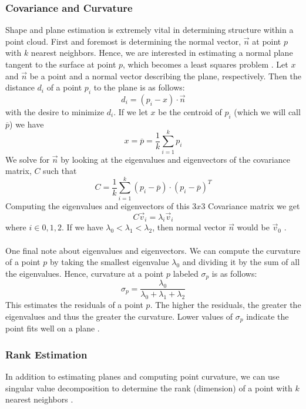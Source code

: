 \documentclass[11pt]{article}
\theoremstyle{definition}
\begin{document}
\subsubsection{Covariance and Curvature}\label{subsub:cov}
Shape and plane estimation is extremely vital in determining structure within a point cloud.   First and foremost is determining the normal vector, $\vec{n}$ at point $p$ with $k$ nearest neighbors.  Hence, we are interested in estimating a normal plane tangent to the surface at point $p$, which becomes a least squares problem \cite{RusuDoctoralDissertation}.  Let $x$ and $\vec{n}$ be a point and a normal vector describing the plane, respectively.  Then the distance $d_i$ of a point $p_i$ to the plane is as follows:
\begin{equation}\label{eqn:least_square}
d_i = (p_i - x)\cdot{\vec{n}}
\end{equation}
with the desire to minimize $d_i$.   If we let $x$ be the centroid of $p_i$ (which we will call $\overline{p}$) we have
\begin{equation}\label{eqn:centroid}
x = \overline{p} = \frac{1}{k}\sum_{i=1}^{k}p_i
\end{equation}
We solve for $\vec{n}$ by looking at the eigenvalues and eigenvectors of the covariance matrix, $C$ such that
\begin{equation}\label{eqn:cov}
C = \frac{1}{k}\sum_{i=1}^{k}(p_i - \overline{p})\cdot(p_i - \overline{p})^T
\end{equation}
Computing the eigenvalues and eigenvectors of this $3x3$ Covariance matrix we get 
\begin{equation}\label{eqn:eigen}
C\vec{v}_i = \lambda_i\vec{v}_i 
\end{equation}
where $i \in {0,1,2}$.  If we have $\lambda_0 < \lambda_1 < \lambda_2$, then normal vector $\vec{n}$ would be $\vec{v}_0$ \cite{RusuDoctoralDissertation}.  
\\\\
One final note about eigenvalues and eigenvectors.  We can compute the curvature of a point $p$ by taking the smallest eigenvalue $\lambda_0$ and dividing it by the sum of all the eigenvalues.  Hence, curvature at a point $p$ labeled $\sigma_p$ is as follows:
\begin{equation}\label{eqn:curvature}
\sigma_p = \frac{\lambda_0}{\lambda_0 + \lambda_1 + \lambda_2}
\end{equation}
This estimates the residuals of a point $p$.  The higher the residuals, the greater the eigenvalues and thus the greater the curvature.  Lower values of $\sigma_p$ indicate the point fits well on a plane \cite{RusuDoctoralDissertation}.  
\subsubsection{Rank Estimation}\label{subsub:rank}
In addition to estimating planes and computing point curvature, we can use singular value decomposition to determine the rank (dimension) of a point with $k$ nearest neighbors \cite{pdal}.  
	\newpage


	
	
\end{document}
